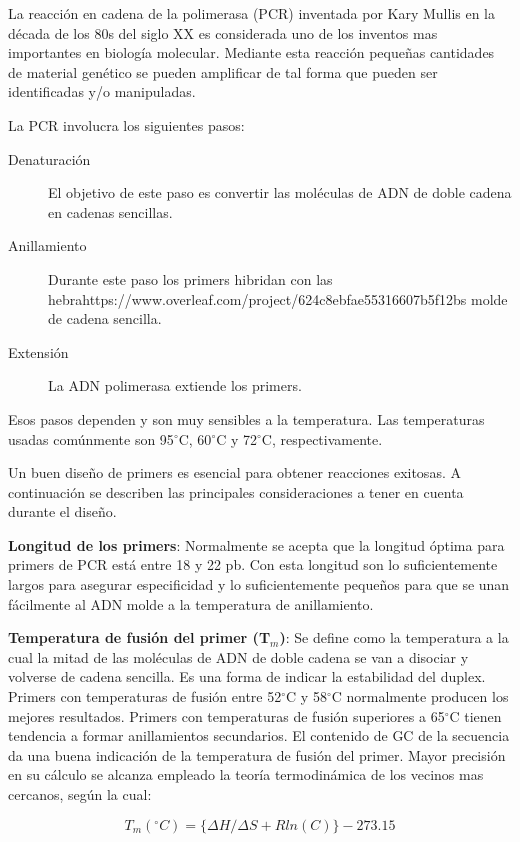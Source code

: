 \documentclass[letter,11pt]{book}
\begin{document}
La reacción en cadena de la polimerasa (PCR) inventada por Kary Mullis en la década de los 80s del siglo XX \citep{Mullis1987} es considerada uno de los inventos mas importantes en biología molecular. Mediante esta reacción pequeñas cantidades de material genético se pueden amplificar de tal forma que pueden ser identificadas y/o manipuladas.

La PCR involucra los siguientes pasos:

\begin{description}
\item[Denaturación] El objetivo de este paso es convertir las moléculas de ADN de doble cadena en cadenas sencillas.
\item[Anillamiento] Durante este paso los primers hibridan con las hebrahttps://www.overleaf.com/project/624c8ebfae55316607b5f12bs molde de cadena sencilla.
\item[Extensión] La ADN polimerasa extiende los primers.
\end{description}

Esos pasos dependen y son muy sensibles a la temperatura. Las temperaturas usadas comúnmente son 95$^\circ$C, 60$^\circ$C y 72$^\circ$C, respectivamente.

Un buen diseño de primers es esencial para obtener reacciones exitosas. A continuación se describen las principales consideraciones a tener en cuenta durante el diseño.

\textbf{Longitud de los primers}: Normalmente se acepta que la longitud óptima para primers de PCR está entre 18 y 22 pb. Con esta longitud son lo suficientemente largos para asegurar especificidad y lo suficientemente pequeños para que se unan fácilmente al ADN molde a la temperatura de anillamiento.

\textbf{Temperatura de fusión del primer (T$_m$)}: Se define como la temperatura a la cual la mitad de las moléculas de ADN de doble cadena se van a disociar y volverse de cadena sencilla. Es una forma de indicar la estabilidad del duplex. Primers con temperaturas de fusión entre 52$^\circ$C y 58$^\circ$C normalmente producen los mejores resultados. Primers con temperaturas de fusión superiores a 65$^\circ$C tienen tendencia a formar anillamientos secundarios. El contenido de GC de la secuencia da una buena indicación de la temperatura de fusión del primer. Mayor precisión en su cálculo se alcanza empleado la teoría termodinámica de los vecinos mas cercanos, según la cual:

\begin{equation}
 T_m(^\circ C) = \lbrace\Delta H/\Delta S +Rln(C)\rbrace-273.15 \label{eq:tm}
\end{equation}
\end{document}
